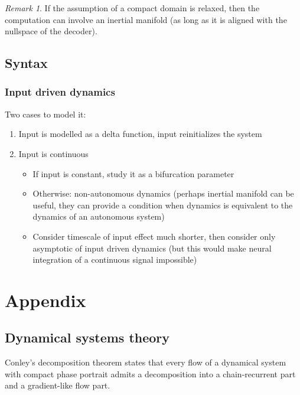 \documentclass{scrartcl}
\theoremstyle{definition}
\theoremstyle{remark}
\newtheorem{remark}{Remark}
\begin{document}
\begin{remark}
If the assumption of a compact domain is relaxed, then the computation can involve an inertial manifold (as long as it is aligned with the nullspace of the decoder).
\end{remark}


\subsection{Syntax}%

\subsubsection{Input driven dynamics}
Two cases to model it:
\begin{enumerate}
\item Input is modelled as a delta function, input reinitializes the system
\item Input is continuous 
\begin{itemize}
\item If input is constant, study it as a bifurcation parameter
\item Otherwise: non-autonomous dynamics (perhaps inertial manifold can be useful, they can provide a condition when dynamics is equivalent to the dynamics of an autonomous system)
\item Consider timescale of input effect much shorter, then consider only asymptotic of input driven dynamics (but this would make neural integration of a continuous signal impossible)
\end{itemize}
\end{enumerate}


\section*{Appendix}
\subsection{Dynamical systems theory}

Conley's decomposition theorem states that every flow of a dynamical system with compact phase portrait admits a decomposition into a chain-recurrent part and a gradient-like flow part.





% 
% 
\end{document}
